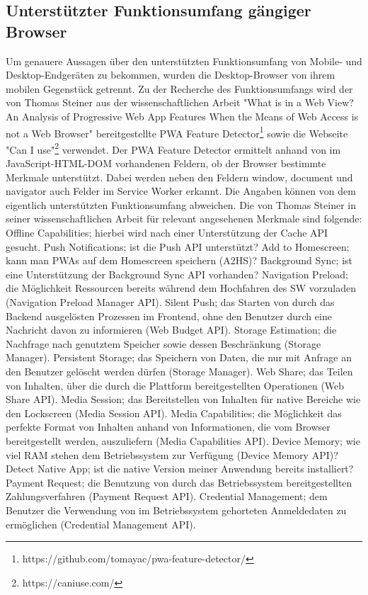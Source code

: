 \subsection{Unterstützter Funktionsumfang gängiger Browser}
\label{subsec:unterstuetzterfunktionsumfanggaengigerbrowser}
Um genauere Aussagen über den unterstützten Funktionsumfang von Mobile-
und Desktop-Endgeräten zu bekommen, wurden die Desktop-Browser von ihrem mobilen
Gegenstück getrennt. Zu der Recherche des Funktionsumfangs wird
der von Thomas Steiner aus der wissenschaftlichen Arbeit "What is
in a Web View? An Analysis of Progressive Web App Features When the
Means of Web Access is not a Web Browser" bereitgestellte
PWA Feature Detector\footnote{https://github.com/tomayac/pwa-feature-detector/} sowie 
die Webseite "Can I use"\footnote{https://caniuse.com/} verwendet.
Der PWA Feature Detector ermittelt anhand von im JavaScript-HTML-DOM
vorhandenen Feldern, ob der Browser bestimmte Merkmale unterstützt.
Dabei werden neben den Feldern window, document und navigator
auch Felder im Service Worker erkannt. Die Angaben können von dem
eigentlich unterstützten Funktionsumfang abweichen. Die von Thomas
Steiner in seiner wissenschaftlichen Arbeit für relevant angesehenen
Merkmale sind folgende: Offline Capabilities; hierbei wird nach
einer Unterstützung der Cache API gesucht. Push Notifications;
ist die Push API unterstützt? Add to Homescreen; kann man PWAs auf
dem Homescreen speichern (A2HS)? Background Sync; ist eine Unterstützung
der Background Sync API vorhanden? Navigation Preload; die Möglichkeit
Ressourcen bereits während dem Hochfahren des SW vorzuladen
(Navigation Preload Manager API). Silent Push; das Starten von durch das
Backend ausgelösten Prozessen im Frontend, ohne den Benutzer
durch eine Nachricht davon zu informieren (Web Budget API). 
Storage Estimation; die Nachfrage nach genutztem Speicher sowie
dessen Beschränkung (Storage Manager). Persistent Storage;
das Speichern von Daten, die nur mit Anfrage an den Benutzer gelöscht
werden dürfen (Storage Manager). Web Share; das Teilen von Inhalten,
über die durch die Plattform bereitgestellten Operationen (Web Share API).
Media Session; das Bereitstellen von Inhalten für native
Bereiche wie den Lockscreen (Media Session API). Media Capabilities;
die Möglichkeit das perfekte Format von Inhalten anhand von
Informationen, die vom Browser bereitgestellt werden, auszuliefern (Media Capabilities API).
Device Memory; wie viel RAM stehen dem Betriebssystem zur
Verfügung (Device Memory API)? Detect Native App; ist die native Version
meiner Anwendung bereits installiert? Payment Request;
die Benutzung von durch das Betriebssystem bereitgestellten
Zahlungsverfahren (Payment Request API). Credential Management;
dem Benutzer die Verwendung von im Betriebssystem gehorteten
Anmeldedaten zu ermöglichen (Credential Management API).\cite[Abschnitt 2.3]{WhatIsInAWebView}

